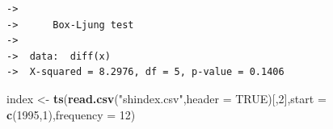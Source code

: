 \documentclass[]{article}
\newenvironment{Shaded}{\begin{snugshade}}{\end{snugshade}}
\newcommand{\KeywordTok}[1]{\textcolor[rgb]{0.13,0.29,0.53}{\textbf{{#1}}}}
\newcommand{\DataTypeTok}[1]{\textcolor[rgb]{0.13,0.29,0.53}{{#1}}}
\newcommand{\DecValTok}[1]{\textcolor[rgb]{0.00,0.00,0.81}{{#1}}}
\newcommand{\StringTok}[1]{\textcolor[rgb]{0.31,0.60,0.02}{{#1}}}
\newcommand{\OtherTok}[1]{\textcolor[rgb]{0.56,0.35,0.01}{{#1}}}
\newcommand{\NormalTok}[1]{{#1}}
\begin{document}
\begin{verbatim}
->  
->      Box-Ljung test
->  
->  data:  diff(x)
->  X-squared = 8.2976, df = 5, p-value = 0.1406
\end{verbatim}

\begin{Shaded}
\begin{Highlighting}[]
\NormalTok{index <-}\StringTok{ }\KeywordTok{ts}\NormalTok{(}\KeywordTok{read.csv}\NormalTok{(}\StringTok{"shindex.csv"}\NormalTok{,}\DataTypeTok{header =} \OtherTok{TRUE}\NormalTok{)[,}\DecValTok{2}\NormalTok{],}\DataTypeTok{start =} \KeywordTok{c}\NormalTok{(}\DecValTok{1995}\NormalTok{,}\DecValTok{1}\NormalTok{),}\DataTypeTok{frequency =} \DecValTok{12}\NormalTok{)}
\end{Highlighting}
\end{Shaded}
\end{document}
